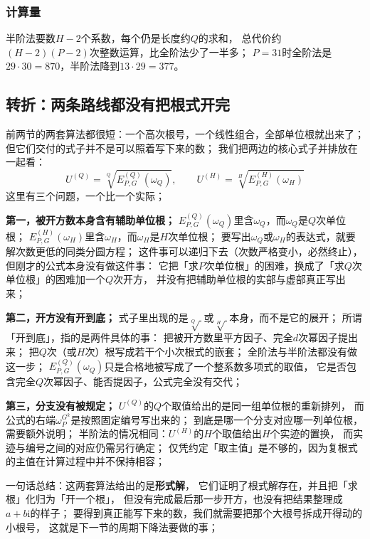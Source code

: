 \documentclass[UTF8,a4paper,11pt]{ctexart}
\newcommand{\ii}{\mathrm{i}}
\begin{document}
\subsubsection{计算量}
半阶法要数$H-2$个系数，每个仍是长度约$Q$的求和，
总代价约$(H-2)(P-2)$次整数运算，比全阶法少了一半多；
$P=31$时全阶法是$29\cdot30=870$，半阶法降到$13\cdot29=377$。
\subsection{转折：两条路线都没有把根式开完}
前两节的两套算法都很短：一个高次根号，一个线性组合，全部单位根就出来了；
但它们交付的式子并不是可以照着写下来的数；
我们把两边的核心式子并排放在一起看：
\[
 U^{(Q)}=\sqrt[Q]{E^{(Q)}_{P,G}(\omega_Q)},\qquad
 U^{(H)}=\sqrt[H]{E^{(H)}_{P,G}(\omega_H)}
\]
这里有三个问题，一个比一个实际；

\textbf{第一，被开方数本身含有辅助单位根；}
$E^{(Q)}_{P,G}(\omega_Q)$里含$\omega_Q$，而$\omega_Q$是$Q$次单位根；
$E^{(H)}_{P,G}(\omega_H)$里含$\omega_H$，而$\omega_H$是$H$次单位根；
要写出$\omega_Q$或$\omega_H$的表达式，就要解次数更低的同类分圆方程；
这件事可以递归下去（次数严格变小，必然终止），
但刚才的公式本身没有做这件事：
它把「求$P$次单位根」的困难，换成了「求$Q$次单位根」的困难加一个$Q$次开方，
并没有把辅助单位根的实部与虚部真正写出来；\par

\textbf{第二，开方没有开到底；}
式子里出现的是$\sqrt[Q]{\ }$或$\sqrt[H]{\ }$本身，而不是它的展开；
所谓「开到底」，指的是两件具体的事：
把被开方数里平方因子、完全$d$次幂因子提出来；
把$Q$次（或$H$次）根写成若干个小次根式的嵌套；
全阶法与半阶法都没有做这一步；
$E^{(Q)}_{P,G}(\omega_Q)$只是合格地被写成了一个整系数多项式的取值，
它是否包含完全$Q$次幂因子、能否提因子，公式完全没有交代；\par

\textbf{第三，分支没有被规定；}
$U^{(Q)}$的$Q$个取值给出的是同一组单位根的重新排列，
而公式的右端$\omega_P^{G^k}$是按照固定编号写出来的；
到底是哪一个分支对应哪一列单位根，需要额外说明；
半阶法的情况相同：$U^{(H)}$的$H$个取值给出$H$个实迹的置换，
而实迹与编号之间的对应仍需另行确定；
仅凭约定「取主值」是不够的，因为复根式的主值在计算过程中并不保持相容；\par

一句话总结：这两套算法给出的是\textbf{形式解}，
它们证明了根式解存在，并且把「求根」化归为「开一个根」，
但没有完成最后那一步开方，也没有把结果整理成$a+b\ii$的样子；
要得到真正能写下来的数，我们就需要把那个大根号拆成开得动的小根号，
这就是下一节的周期下降法要做的事；\par
\end{document}
